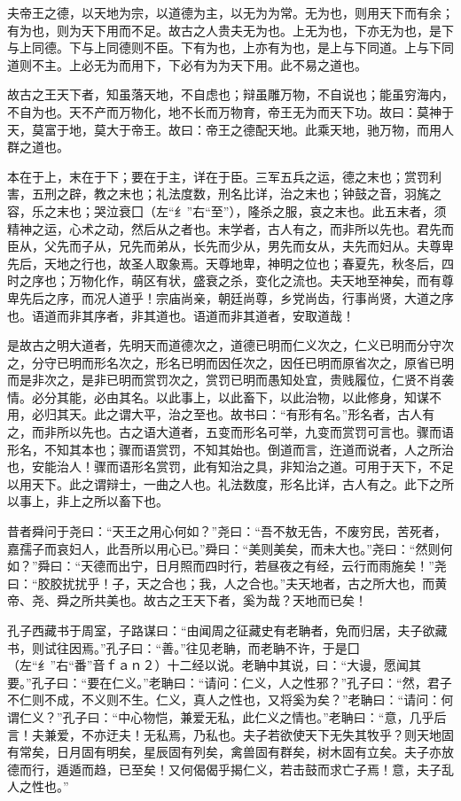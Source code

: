 \documentclass[]{article}
\begin{document}
夫帝王之德，以天地为宗，以道德为主，以无为为常。无为也，则用天下而有余；有为也，则为天下用而不足。故古之人贵夫无为也。上无为也，下亦无为也，是下与上同德。下与上同德则不臣。下有为也，上亦有为也，是上与下同道。上与下同道则不主。上必无为而用下，下必有为为天下用。此不易之道也。

故古之王天下者，知虽落天地，不自虑也；辩虽雕万物，不自说也；能虽穷海内，不自为也。天不产而万物化，地不长而万物育，帝王无为而天下功。故曰：莫神于天，莫富于地，莫大于帝王。故曰：帝王之德配天地。此乘天地，驰万物，而用人群之道也。

本在于上，末在于下；要在于主，详在于臣。三军五兵之运，德之末也；赏罚利害，五刑之辟，教之末也；礼法度数，刑名比详，治之末也；钟鼓之音，羽旄之容，乐之末也；哭泣衰囗（左``纟''右``至''），隆杀之服，哀之末也。此五末者，须精神之运，心术之动，然后从之者也。末学者，古人有之，而非所以先也。君先而臣从，父先而子从，兄先而弟从，长先而少从，男先而女从，夫先而妇从。夫尊卑先后，天地之行也，故圣人取象焉。天尊地卑，神明之位也；春夏先，秋冬后，四时之序也；万物化作，萌区有状，盛衰之杀，变化之流也。夫天地至神矣，而有尊卑先后之序，而况人道乎！宗庙尚亲，朝廷尚尊，乡党尚齿，行事尚贤，大道之序也。语道而非其序者，非其道也。语道而非其道者，安取道哉！

是故古之明大道者，先明天而道德次之，道德已明而仁义次之，仁义已明而分守次之，分守已明而形名次之，形名已明而因任次之，因任已明而原省次之，原省已明而是非次之，是非已明而赏罚次之，赏罚已明而愚知处宜，贵贱履位，仁贤不肖袭情。必分其能，必由其名。以此事上，以此畜下，以此治物，以此修身，知谋不用，必归其天。此之谓大平，治之至也。故书曰：``有形有名。''形名者，古人有之，而非所以先也。古之语大道者，五变而形名可举，九变而赏罚可言也。骤而语形名，不知其本也；骤而语赏罚，不知其始也。倒道而言，迕道而说者，人之所治也，安能治人！骤而语形名赏罚，此有知治之具，非知治之道。可用于天下，不足以用天下。此之谓辩士，一曲之人也。礼法数度，形名比详，古人有之。此下之所以事上，非上之所以畜下也。

昔者舜问于尧曰：``天王之用心何如？''尧曰：``吾不敖无告，不废穷民，苦死者，嘉孺子而哀妇人，此吾所以用心已。''舜曰：``美则美矣，而未大也。''尧曰：``然则何如？''舜曰：``天德而出宁，日月照而四时行，若昼夜之有经，云行而雨施矣！''尧曰：``胶胶扰扰乎！子，天之合也；我，人之合也。''夫天地者，古之所大也，而黄帝、尧、舜之所共美也。故古之王天下者，奚为哉？天地而已矣！

孔子西藏书于周室，子路谋曰：``由闻周之征藏史有老聃者，免而归居，夫子欲藏书，则试往因焉。''孔子曰：``善。''往见老聃，而老聃不许，于是囗（左``纟''右``番''音ｆａｎ２）十二经以说。老聃中其说，曰：``大谩，愿闻其要。''孔子曰：``要在仁义。''老聃曰：``请问：仁义，人之性邪？''孔子曰：``然，君子不仁则不成，不义则不生。仁义，真人之性也，又将奚为矣？''老聃曰：``请问：何谓仁义？''孔子曰：``中心物恺，兼爱无私，此仁义之情也。''老聃曰：``意，几乎后言！夫兼爱，不亦迂夫！无私焉，乃私也。夫子若欲使天下无失其牧乎？则天地固有常矣，日月固有明矣，星辰固有列矣，禽兽固有群矣，树木固有立矣。夫子亦放德而行，遁遁而趋，已至矣！又何偈偈乎揭仁义，若击鼓而求亡子焉！意，夫子乱人之性也。''
\end{document}
